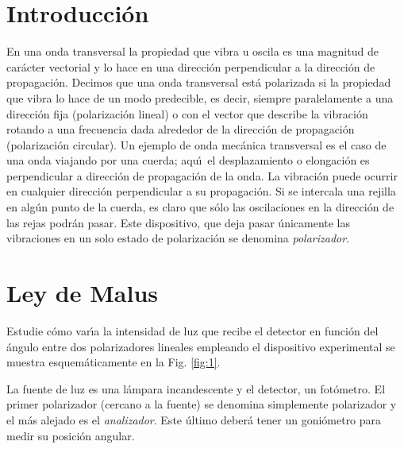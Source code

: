 \documentclass[laboratorio]{guia}
\begin{document}
\maketitle

\section{Introducci\'on}
En una onda transversal la propiedad que vibra u oscila es una magnitud de 
car\'acter vectorial y lo hace en una direcci\'on perpendicular a la 
direcci\'on de propagaci\'on. Decimos que una onda transversal est\'a 
polarizada si la propiedad que vibra lo hace de un modo predecible, es decir,
siempre paralelamente a una direcci\'on fija (polarizaci\'on lineal) o con el
vector que describe la vibraci\'on rotando a una frecuencia dada alrededor de
la direcci\'on de propagaci\'on (polarizaci\'on circular). Un ejemplo de onda
mec\'anica transversal es el caso de una onda viajando por una cuerda; aqu\'\i\
el desplazamiento o elongaci\'on es perpendicular a direcci\'on de 
propagaci\'on de la onda. La vibraci\'on puede ocurrir en cualquier direcci\'on
perpendicular a su propagaci\'on. Si se intercala una rejilla en alg\'un punto
de la cuerda, es claro que s\'olo las oscilaciones en la direcci\'on de las 
rejas podr\'an pasar. Este dispositivo, que deja pasar \'unicamente las 
vibraciones en un solo estado de polarizaci\'on se denomina {\it polarizador}.

\section{Ley de Malus}
Estudie c\'omo var\'\i a la intensidad de luz que recibe el detector en 
funci\'on del \'angulo entre dos polarizadores lineales empleando el 
dispositivo experimental se muestra esquem\'aticamente en la Fig. \ref{fig:1}.

La fuente de luz es una l\'ampara incandescente y el detector, un fot\'ometro.
El primer polarizador (cercano a la fuente) se denomina simplemente polarizador
y el m\'as alejado es el {\it analizador}. Este \'ultimo deber\'a tener un 
goni\'ometro para medir su posici\'on angular.
\end{document}
